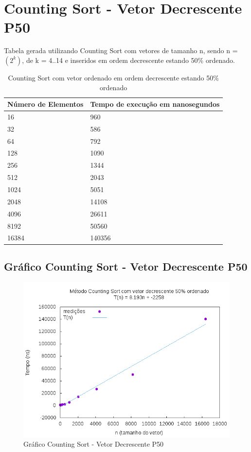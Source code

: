 \documentclass[12pt,a4paper,twoside]{report}
\begin{document}
\section{Counting Sort - Vetor Decrescente P50}
Tabela gerada utilizando Counting Sort com vetores de tamanho n, sendo n = $(2^k)$, de k = 4..14 e inseridos em ordem decrescente estando 50\% ordenado.
\begin{table}[H]
\centering
\caption{Counting Sort com vetor ordenado em ordem decrescente estando 50\% ordenado}
\label{my-label}
\begin{tabular}{|l|l|}
\hline
\multicolumn{1}{|c|}{\textbf{Número de Elementos}} & \multicolumn{1}{c|}{\textbf{Tempo de execução em nanosegundos}} \\ \hline
16 & 960 \\ \hline
32 & 586 \\ \hline
64 & 792 \\ \hline
128 & 1090 \\ \hline
256 & 1344 \\ \hline
512 & 2043 \\ \hline
1024 & 5051 \\ \hline
2048 & 14108 \\ \hline
4096 & 26611 \\ \hline
8192 & 50560 \\ \hline
16384 & 140356 \\ \hline
\end{tabular}
\end{table}

\subsection{Gráfico Counting Sort - Vetor Decrescente P50}
\begin{figure}[H]
    \centering
    \includegraphics[width=0.7\linewidth]{graficos/CountingSort/vIntDecrescenteP50/vIntDecrescenteP50.png}
  \caption{Gráfico Counting Sort - Vetor Decrescente P50}
\end{figure}
\end{document}

